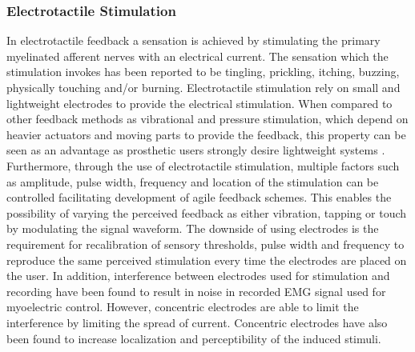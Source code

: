 \subsubsection{Electrotactile Stimulation} \label{E-stim}

In electrotactile feedback a sensation is achieved by stimulating the primary myelinated afferent nerves with an electrical current. The sensation which the stimulation invokes has been reported to be tingling, prickling, itching, buzzing, physically touching and/or burning. \cite{Schofield2014} Electrotactile stimulation rely on small and lightweight electrodes to provide the electrical stimulation. When compared to other feedback methods as vibrational and pressure stimulation, which depend on heavier actuators and moving parts to provide the feedback, this property can be seen as an advantage as prosthetic users strongly desire lightweight systems \cite{Stephens-Fripp2018,Benz2016}. Furthermore, through the use of electrotactile stimulation, multiple factors such as amplitude, pulse width, frequency and location of the stimulation can be controlled facilitating development of agile feedback schemes. This enables the possibility of varying the perceived feedback as either vibration, tapping or touch by modulating the signal waveform. The downside of using electrodes is the requirement for recalibration of sensory thresholds, pulse width and frequency to reproduce the same perceived stimulation every time the electrodes are placed on the user. In addition, interference between electrodes used for stimulation and recording have been found to result in noise in recorded EMG signal used for myoelectric control. However, concentric electrodes are able to limit the interference by limiting the spread of current. Concentric electrodes have also been found to increase localization and perceptibility of the induced stimuli. \cite{Schofield2014,Stephens-Fripp2018,Antfolk2018} 







